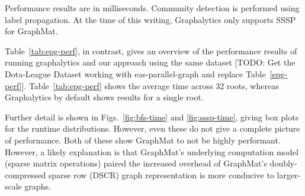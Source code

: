 \documentclass{llncs}
\begin{document}

\begin{table}
	\caption{Performance results are in milliseconds. Community detection is performed using label propagation. At the time of this writing, Graphalytics only supports SSSP for GraphMat.}
	\centering
	\label{tab:graphalytics}
\end{table}

Table~\ref{tab:epg-perf}, in contrast, gives an overview of the performance results of running graphalytics and our approach using the same dataset [TODO: Get the Dota-League Dataset working with eas-parallel-graph and replace Table~\ref{epg-perf}]. Table~\ref{tab:epg-perf} shows the average time across 32 roots, whereas Graphalytics by default shows results for a single root.

Further detail is shown in Figs.~\ref{fig:bfs-time} and \ref{fig:sssp-time}, giving box plots for the runtime distributions. However, even these do not give a complete picture of performance. Both of these show GraphMat to not be highly performant. However, a likely explanation is that GraphMat's underlying computation model (sparse matrix operations) paired the increased overhead of GraphMat's doubly-compressed sparse row (DSCR) graph representation is more conducive to larger-scale graphs.
\end{document}
